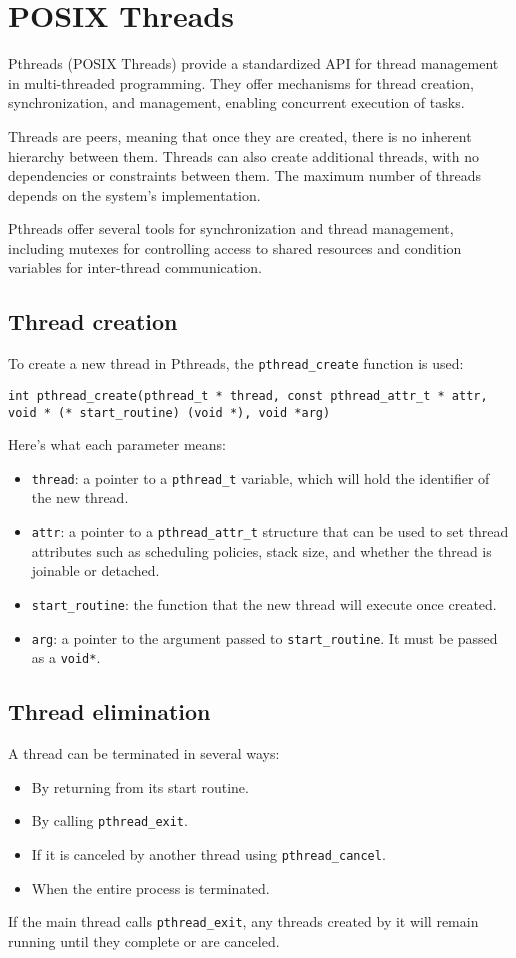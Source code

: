 \section{POSIX Threads}

Pthreads (POSIX Threads) provide a standardized API for thread management in multi-threaded programming. 
They offer mechanisms for thread creation, synchronization, and management, enabling concurrent execution of tasks.

Threads are peers, meaning that once they are created, there is no inherent hierarchy between them. 
Threads can also create additional threads, with no dependencies or constraints between them. 
The maximum number of threads depends on the system's implementation.

Pthreads offer several tools for synchronization and thread management, including mutexes for controlling access to shared resources and condition variables for inter-thread communication.

\subsection{Thread creation}
To create a new thread in Pthreads, the \texttt{pthread\_create} function is used:
\begin{lstlisting}[style=C]
int pthread_create(pthread_t * thread, const pthread_attr_t * attr, void * (* start_routine) (void *), void *arg)
\end{lstlisting}
Here's what each parameter means:
\begin{itemize}
    \item \texttt{thread}: a pointer to a \texttt{pthread\_t} variable, which will hold the identifier of the new thread.
    \item \texttt{attr}: a pointer to a \texttt{pthread\_attr\_t} structure that can be used to set thread attributes such as scheduling policies, stack size, and whether the thread is joinable or detached.
    \item \texttt{start\_routine}: the function that the new thread will execute once created.
    \item \texttt{arg}: a pointer to the argument passed to \texttt{start\_routine}. 
        It must be passed as a \texttt{void*}.
\end{itemize}

\subsection{Thread elimination}
A thread can be terminated in several ways:
\begin{itemize}
    \item By returning from its start routine.
    \item By calling \texttt{pthread\_exit}.
    \item If it is canceled by another thread using \texttt{pthread\_cancel}.
    \item When the entire process is terminated.
\end{itemize}
If the main thread calls \texttt{pthread\_exit}, any threads created by it will remain running until they complete or are canceled.

